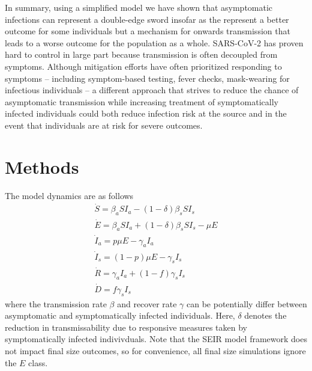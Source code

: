 \documentclass[12pt]{article}
\begin{document}
In summary, using a simplified model we have shown that asymptomatic infections can represent
a double-edge sword insofar as the represent a better outcome for some individuals but a mechanism for onwards transmission that leads to a worse outcome for the population as a whole. SARS-CoV-2 has proven hard to control in large part because transmission is often decoupled from symptoms.  Although mitigation efforts have often prioritized responding to symptoms -- including symptom-based testing, fever checks, mask-wearing for infectious individuals -- a different approach that strives to reduce the chance of asymptomatic transmission while increasing treatment of symptomatically infected individuals could both reduce infection risk at the source and in the event that individuals are at risk for severe outcomes.

\section*{Methods}
\label{sec.methods}
The model dynamics are as follows
\begin{eqnarray}
\dot{S}=\beta_a S I_a -(1-\delta) \beta_s S I_s \\
\dot{E} = \beta_a S I_a + (1-\delta) \beta_s S I_s - \mu E\\
\dot{I}_a = p \mu E - \gamma_a I_a\\
\dot{I}_s = (1-p) \mu E -\gamma_s I_s\\
\dot{R} = \gamma_a I_a + (1-f) \gamma_s I_s \\
\dot{D} = f \gamma_s I_s
\end{eqnarray}
where the transmission rate $\beta$ and recover rate $\gamma$ can be potentially differ
between asymptomatic and symptomatically infected individuals.  Here, $\delta$ denotes the reduction in transmissability due to responsive measures taken by symptomatically infected indivivduals. Note that the SEIR model framework does not impact final size outcomes, so for convenience, all final size simulations ignore the $E$ class.


\end{document}
